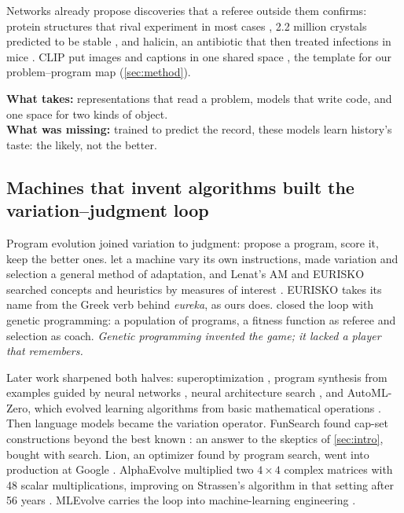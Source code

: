 Networks already propose discoveries that a referee outside them confirms:
protein structures that rival experiment in most cases
\citep{jumper2021alphafold},
2.2 million crystals predicted to be stable \citep{merchant2023gnome}, and
halicin, an antibiotic that then treated infections in mice
\citep{stokes2020halicin}. CLIP put images and captions in one shared space
\citep{radford2021clip}, the template for our problem--program map
(\cref{sec:method}).

\smallskip
\noindent\textbf{What \EZ{} takes:} representations that read a problem,
models that write code, and one space for two kinds of object.\\
\textbf{What was missing:} trained to predict the record, these models learn
history's taste: the likely, not the better.

\subsection{Machines that invent algorithms built the variation--judgment loop}\label{sub:road-programs}

Program evolution joined variation to judgment: propose a program, score
it, keep the better ones. \citet{friedberg1958learning} let a machine vary
its own instructions, \citet{holland1975adaptation} made variation and
selection a general method of adaptation, and Lenat's AM and EURISKO
searched concepts and heuristics by measures of interest
\citep{lenat1976am,lenat1983eurisko}. EURISKO takes its name from the Greek
verb behind \emph{eureka}, as ours does. \citet{koza1992genetic} closed the
loop with genetic programming: a population of programs, a fitness function
as referee and selection as coach. \emph{Genetic programming invented the
game; it lacked a player that remembers.}

Later work sharpened both halves: superoptimization
\citep{massalin1987superoptimizer}, program synthesis from examples
\citep{gulwani2011flashfill} guided by neural networks
\citep{balog2017deepcoder}, neural architecture search \citep{zoph2017nas},
and AutoML-Zero, which evolved learning algorithms from basic mathematical
operations \citep{real2020automlzero}. Then language models became the
variation operator. FunSearch found cap-set constructions beyond the best
known \citep{romeraparedes2024funsearch}: an answer to the skeptics of
\cref{sec:intro}, bought with search. Lion, an optimizer found by program
search, went into production at Google \citep{chen2023lion}. AlphaEvolve
multiplied two $4\times4$ complex matrices with 48 scalar multiplications,
improving on Strassen's algorithm in that setting after 56 years
\citep{novikov2025alphaevolve}. MLEvolve carries the loop into
machine-learning engineering \citep{mlevolve2026}.

